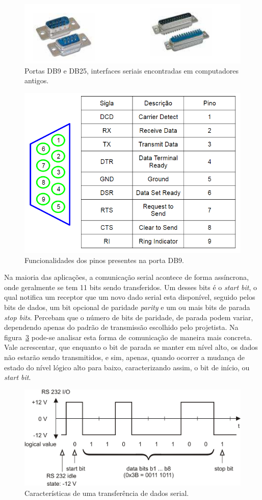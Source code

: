 \documentclass[12pt]{article}
\begin{document}
\begin{figure}[h]
\centering
\includegraphics[width=.5\textwidth]{img/fig8DB9DB25.png}
\caption{Portas DB9 e DB25, interfaces seriais encontradas em computadores antigos.}
\label{fig:db9db25}
\end{figure}

\begin{figure}[h]
\centering
\includegraphics[width=.5\textwidth]{img/Fig9serial_pinos.png}
\caption{Funcionalidades dos pinos presentes na porta DB9.}
\label{fig:pinosdb9}
\end{figure}



Na maioria das aplicações, a comunicação serial acontece de forma assíncrona, onde geralmente se tem 11 bits sendo transferidos. Um desses bits é o \textit{start bit}, o qual notifica um receptor que um novo dado serial esta disponível, seguido pelos bits de dados, um bit opcional de paridade \textit{parity} e um ou mais bits de parada \textit{stop bits}\cite{porta-serial}. Percebam que o número de bits de paridade, de parada podem variar, dependendo apenas do padrão de transmissão escolhido pelo projetista. Na figura~\ref{fig:cserial} pode-se analisar esta forma de comunicação de maneira mais concreta. Vale acrescentar, que enquanto o bit de parada se manter em nível alto, os dados não estarão sendo transmitidos, e sim, apenas, quando ocorrer a mudança de estado do nível lógico alto para baixo, caracterizando assim, o bit de início, ou \textit{start bit}. 


\begin{figure}[h]
\centering
\includegraphics[width=.5\textwidth]{img/Fig10rs232.jpg}
\caption{Características de uma transferência de dados serial.}
\label{fig:cserial}
\end{figure}
\end{document}
